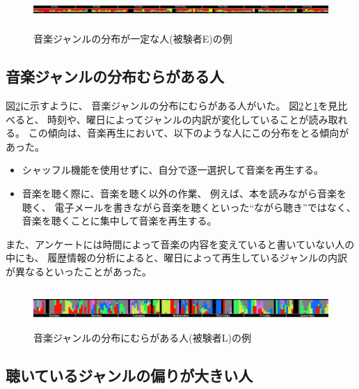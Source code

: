 \documentclass[11pt, onecolumn]{jsarticle}
\begin{document}
\begin{figure}[h]
\begin{center}
\includegraphics[width=14cm, height=1.5cm]{genreMap_regular.jpg}
\caption{音楽ジャンルの分布が一定な人(被験者E)の例}
\label{genreMap_regular}
\end{center}
\end{figure}

\subsection{音楽ジャンルの分布むらがある人}
図\ref{genreMap_irregular}に示すように、
音楽ジャンルの分布にむらがある人がいた。
図\ref{genreMap_irregular}と\ref{genreMap_regular}を見比べると、
時刻や、曜日によってジャンルの内訳が変化していることが読み取れる。
この傾向は、音楽再生において、以下のような人にこの分布をとる傾向があった。
\begin{itemize}
\item
シャッフル機能を使用せずに、自分で逐一選択して音楽を再生する。
\item
音楽を聴く際に、音楽を聴く以外の作業、
例えば、本を読みながら音楽を聴く、
電子メールを書きながら音楽を聴くといった``ながら聴き''ではなく、
音楽を聴くことに集中して音楽を再生する。
\end{itemize}
また、アンケートには時間によって音楽の内容を変えていると書いていない人の中にも、
履歴情報の分析によると、曜日によって再生しているジャンルの内訳が異なるといったことがあった。


\begin{figure}[h]
\begin{center}
\includegraphics[width=14cm, height=1.5cm]{genreMap_irregular.jpg}
\caption{音楽ジャンルの分布にむらがある人(被験者L)の例}
\label{genreMap_irregular}
\end{center}
\end{figure}

\subsection{聴いているジャンルの偏りが大きい人}
\end{document}
